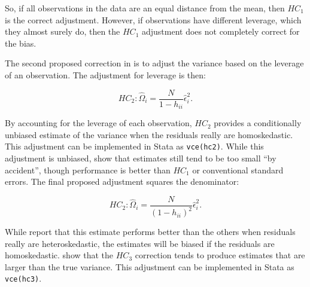 \documentclass[11pt]{article}
\begin{document}
\noindent So, if all observations in the data are an equal distance from the mean, then $HC_1$ is the correct adjustment. However, if observations have different leverage, which they almost surely do, then the $HC_1$ adjustment does not completely correct for the bias.

The second proposed correction in \cite{mackinnon_heteroskedasticity-consistent_1985} is to adjust the variance based on the leverage of an observation. The adjustment for leverage is then:

\begin{equation}
    HC_2 : \hat{\Omega}_i = \frac{N}{1-h_{ii}} \hat{\epsilon}_{i}^{2}.
\end{equation}

\noindent By accounting for the leverage of each observation, $HC_2$ provides a conditionally unbiased estimate of the variance when the residuals really are homoskedastic. This adjustment can be implemented in Stata as \texttt{vce(hc2)}. While this adjustment is unbiased, \cite{angrist_mostly_2009} show that estimates still tend to be too small ``by accident'', though performance is better than $HC_1$ or conventional standard errors. The final proposed adjustment squares the denominator:

\begin{equation}
    HC_2 : \hat{\Omega}_i = \frac{N}{\left( 1-h_{ii} \right)^2} \hat{\epsilon}_{i}^{2}.
\end{equation}

\noindent While \cite{davidson_estimation_1993} report that this estimate performs better than the others when residuals really are heteroskedastic, the estimates will be biased if the residuals are homoskedastic. \cite{angrist_mostly_2009} show that the $HC_3$ correction tends to produce estimates that are larger than the true variance. This adjustment can be implemented in Stata as \texttt{vce(hc3)}.
\end{document}
